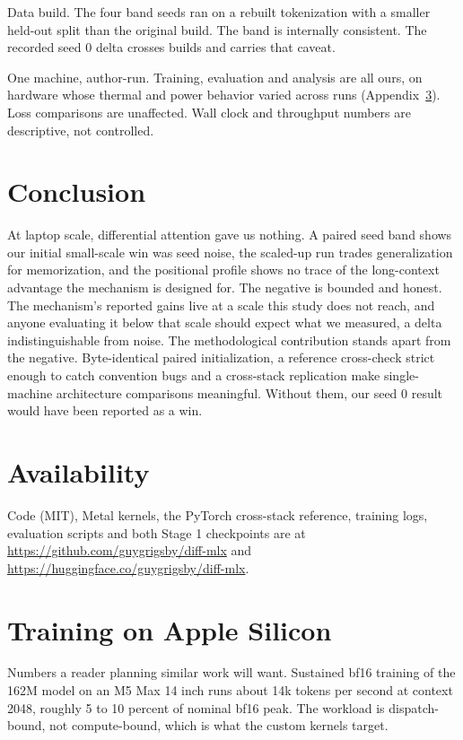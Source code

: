 \documentclass[11pt]{article}
\begin{document}
Data build. The four band seeds ran on a rebuilt tokenization with a
smaller held-out split than the original build. The band is internally
consistent. The recorded seed 0 delta crosses builds and carries that
caveat.

One machine, author-run. Training, evaluation and analysis are all
ours, on hardware whose thermal and power behavior varied across runs
(Appendix~\ref{app:silicon}). Loss comparisons are unaffected. Wall
clock and throughput numbers are descriptive, not controlled.

\section{Conclusion}
At laptop scale, differential attention gave us nothing. A paired
seed band shows our initial small-scale win was seed noise, the
scaled-up run trades generalization for memorization, and the
positional profile shows no trace of the long-context advantage the
mechanism is designed for. The negative is bounded and honest. The
mechanism's reported gains live at a scale this study does not reach,
and anyone evaluating it below that scale should expect what we
measured, a delta indistinguishable from noise. The methodological
contribution stands apart from the negative. Byte-identical paired
initialization, a reference cross-check strict enough to catch
convention bugs and a cross-stack replication make single-machine
architecture comparisons meaningful. Without them, our seed 0 result
would have been reported as a win.

\section{Availability}
Code (MIT), Metal kernels, the PyTorch cross-stack reference, training
logs, evaluation scripts and both Stage 1 checkpoints are at
\url{https://github.com/guygrigsby/diff-mlx} and
\url{https://huggingface.co/guygrigsby/diff-mlx}.

\appendix
\section{Training on Apple Silicon}
\label{app:silicon}
Numbers a reader planning similar work will want. Sustained bf16
training of the 162M model on an M5 Max 14 inch runs about 14k tokens per
second at context 2048, roughly 5 to 10 percent of nominal bf16 peak.
The workload is dispatch-bound, not compute-bound, which is what the
custom kernels target.
\end{document}
